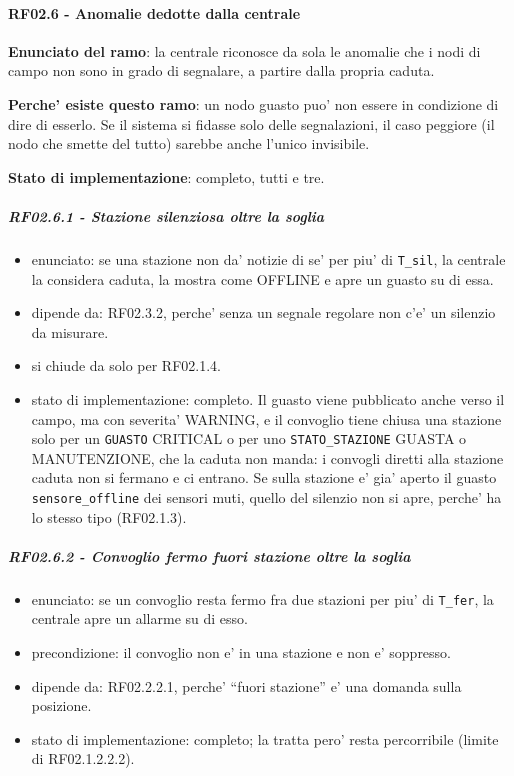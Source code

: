 \documentclass[11pt]{article}
\begin{document}
\paragraph{RF02.6 - Anomalie dedotte dalla centrale}
\label{sec:org51833de}

\textbf{Enunciato del ramo}: la centrale riconosce da sola le anomalie che i nodi di campo non sono in grado
di segnalare, a partire dalla propria caduta.

\textbf{Perche' esiste questo ramo}: un nodo guasto puo' non essere in condizione di dire di esserlo. Se il
sistema si fidasse solo delle segnalazioni, il caso peggiore (il nodo che smette del tutto) sarebbe
anche l'unico invisibile.

\textbf{Stato di implementazione}: completo, tutti e tre.
\subparagraph{RF02.6.1 - Stazione silenziosa oltre la soglia}
\label{sec:orgd8d0fbe}
\begin{itemize}
\item enunciato: se una stazione non da' notizie di se' per piu' di \texttt{T\_sil}, la centrale la considera
caduta, la mostra come OFFLINE e apre un guasto su di essa.
\item dipende da: RF02.3.2, perche' senza un segnale regolare non c'e' un silenzio da misurare.
\item si chiude da solo per RF02.1.4.
\item stato di implementazione: completo. Il guasto viene pubblicato anche verso il campo, ma con
severita' WARNING, e il convoglio tiene chiusa una stazione solo per un \texttt{GUASTO} CRITICAL o per uno
\texttt{STATO\_STAZIONE} GUASTA o MANUTENZIONE, che la caduta non manda: i convogli diretti alla stazione
caduta non si fermano e ci entrano. Se sulla stazione e' gia' aperto il guasto \texttt{sensore\_offline}
dei sensori muti, quello del silenzio non si apre, perche' ha lo stesso tipo (RF02.1.3).
\end{itemize}
\subparagraph{RF02.6.2 - Convoglio fermo fuori stazione oltre la soglia}
\label{sec:orgb72f001}
\begin{itemize}
\item enunciato: se un convoglio resta fermo fra due stazioni per piu' di \texttt{T\_fer}, la centrale apre un
allarme su di esso.
\item precondizione: il convoglio non e' in una stazione e non e' soppresso.
\item dipende da: RF02.2.2.1, perche' ``fuori stazione'' e' una domanda sulla posizione.
\item stato di implementazione: completo; la tratta pero' resta percorribile (limite di RF02.1.2.2.2).
\end{itemize}
\end{document}
